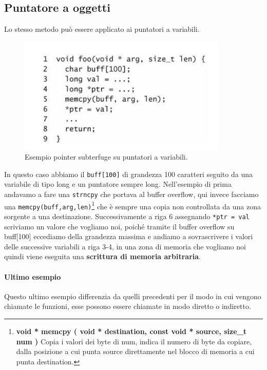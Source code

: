 \subsection{Puntatore a oggetti}
Lo stesso metodo può essere applicato ai puntatori a variabili.
\begin{figure}[H]
	\centering
	\includegraphics[width=10cm, keepaspectratio]{capitoli/secure_coding/img/cap_5/es_pointer_var.png}
	\caption{Esempio pointer subterfuge su puntatori a variabili.}\label{fig:es_poin_var}
\end{figure}
In questo caso abbiamo il \verb|buff[100]| di grandezza 100 caratteri seguito da una variabile di tipo long e un puntatore sempre long. Nell'esempio di prima andavamo a fare una \verb|strncpy| che portava al buffer overflow, qui invece facciamo una \verb|memcpy(buff,arg,len)|\footnote{\textbf{void * memcpy ( void * destination, const void * source, size\_t num )}  Copia i valori dei byte di num, indica il numero di byte da copiare, dalla posizione a cui punta source direttamente nel blocco di memoria a cui punta destination.} che è sempre una copia non controllata da una zona sorgente a una destinazione. Successivamente a riga 6 assegnando \verb|*ptr = val| scriviamo un valore che vogliamo noi, poiché tramite il buffer overflow su buff[100] eccediamo della grandezza massima e andiamo a sovrascrivere i valori delle successive variabili a riga 3-4, in una zona di memoria che vogliamo noi quindi viene eseguita una \textbf{scrittura di memoria arbitraria}.

\paragraph{Ultimo esempio}
Questo ultimo esempio differenzia da quelli precedenti per il modo in cui vengono chiamate le funzioni, esse possono essere chiamate in modo diretto o indiretto.

